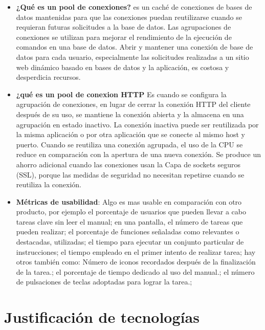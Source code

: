 \begin{itemize}
\item \textbf{¿Qué es un pool de conexiones?} es un caché de conexiones de bases de datos mantenidas para que las conexiones puedan reutilizarse cuando se requieran futuras solicitudes a la base de datos. Las agrupaciones de conexiones se utilizan para mejorar el rendimiento de la ejecución de comandos en una base de datos. Abrir y mantener una conexión de base de datos para cada usuario, especialmente las solicitudes realizadas a un sitio web dinámico basado en bases de datos y la aplicación, es costosa y desperdicia recursos.
\item \textbf{¿qué es un pool de conexion HTTP} Es cuando se configura la agrupación de conexiones, en lugar de cerrar la conexión HTTP del cliente después de su uso, se mantiene la conexión abierta y la almacena en una agrupación en estado inactivo. La conexión inactiva puede ser reutilizada por la misma aplicación o por otra aplicación que se conecte al mismo host y puerto. Cuando se reutiliza una conexión agrupada, el uso de la CPU se reduce en comparación con la apertura de una nueva conexión. Se produce un ahorro adicional cuando las conexiones usan la Capa de sockets seguros (SSL), porque las medidas de seguridad no necesitan repetirse cuando se reutiliza la conexión.
\item \textbf{Métricas de usabilidad}: Algo es mas usable en comparación con otro producto, por ejemplo el porcentaje de usuarios que pueden llevar a cabo tareas clave sin leer el manual; en una pantalla,  el número de tareas que pueden realizar;  el porcentaje de funciones señaladas como relevantes o destacadas,  utilizadas; el tiempo para ejecutar un conjunto particular de instrucciones; el tiempo empleado en el primer intento de realizar tarea;  hay otros también como: Número de iconos recordados después de la finalización de la tarea.; el porcentaje de tiempo dedicado al uso del manual.; el número de pulsaciones de teclas adoptadas para lograr la tarea.;
 \end{itemize}



\section{Justificación de tecnologías}

